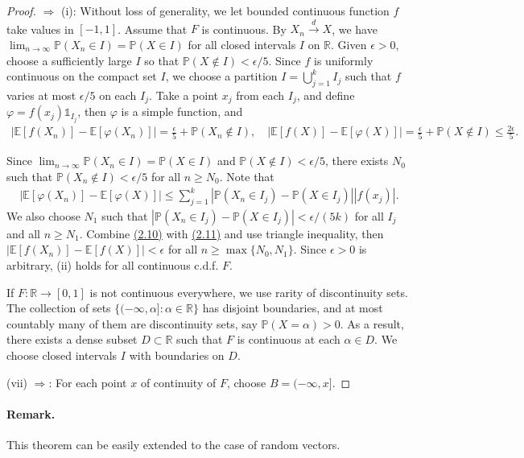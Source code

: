 \documentclass{article}
\numberwithin{equation}{section}
\newcommand{\E}{\mathbb{E}}
\renewcommand{\P}{\mathbb{P}}
\theoremstyle{plain}
\theoremstyle{definition}
\begin{document}
\begin{proof}
$\Rightarrow$ (i): Without loss of generality, we let bounded continuous function $f$ take values in $[-1,1]$. Assume that $F$ is continuous. By $X_n\overset{d}{\to}X$, we have $\lim_{n\to\infty}\P(X_n\in I)=\P(X\in I)$ for all closed intervals $I$ on $\mathbb{R}$. Given $\epsilon>0$, choose a sufficiently large $I$ so that $\P(X\notin I)<\epsilon/5$. Since $f$ is uniformly continuous on the compact set $I$, we choose a partition $I=\bigcup_{j=1}^k I_j$ such that $f$ varies at most $\epsilon/5$ on each $I_j$. Take a point $x_j$ from each $I_j$, and define $\varphi=f(x_j)\mathds{1}_{I_j}$, then $\varphi$ is a simple function, and
\begin{align*}
	\left\vert\E[f(X_n)]-\E[\varphi(X_n)]\right\vert =\frac{\epsilon}{5}+\P(X_n\notin I),\quad \left\vert \E[f(X)]-\E[\varphi(X)]\right\vert =\frac{\epsilon}{5}+\P(X\notin I)\leq\frac{2\epsilon}{5}.\tag{2.10}\label{eq:2.10}
\end{align*}

Since $\lim_{n\to\infty}\P(X_n\in I)=\P(X\in I)$ and $\P(X\notin I)<\epsilon/5$, there exists $N_0$ such that $\P(X_n\notin I)<\epsilon/5$ for all $n\geq N_0$. Note that 
\begin{align*}
	\left\vert\E[\varphi(X_n)]-\E[\varphi(X)]\right\vert\leq\sum_{j=1}^k\left\vert\P(X_n\in I_j)-\P(X\in I_j)\right\vert\left\vert f(x_j)\right\vert.\tag{2.11}\label{eq:2.11}
\end{align*}
We also choose $N_1$ such that $\left\vert\P(X_n\in I_j)-\P(X\in I_j)\right\vert<\epsilon/(5k)$ for all $I_j$ and all $n\geq N_1$. Combine \hyperref[eq:2.10]{(2.10)} with \hyperref[eq:2.11]{(2.11)} and use triangle inequality, then $\left\vert\E[f(X_n)]-\E[f(X)]\right\vert < \epsilon$ for all $n\geq\max\{N_0,N_1\}$. Since $\epsilon>0$ is arbitrary, (ii) holds for all continuous c.d.f. $F$.

If $F:\mathbb{R}\to[0,1]$ is not continuous everywhere, we use rarity of discontinuity sets. The collection of sets $\{(-\infty,\alpha]:\alpha\in\mathbb{R}\}$ has disjoint boundaries, and at most countably many of them are discontinuity sets, say $\P(X=\alpha)>0$. As a result, there exists a dense subset $D\subset\mathbb{R}$ such that $F$ is continuous at each $\alpha\in D$. We choose closed intervals $I$ with boundaries on $D$.

(vii) $\Rightarrow$: For each point $x$ of continuity of $F$, choose $B=(-\infty,x]$.
\end{proof}

\paragraph{Remark.} This theorem can be easily extended to the case of random vectors.
\end{document}
